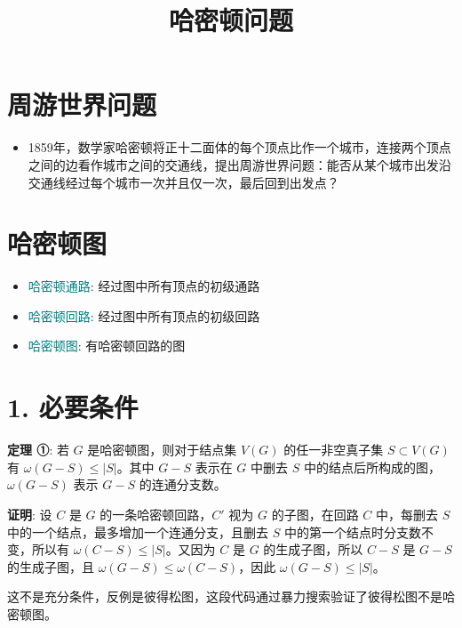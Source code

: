 \documentclass{article}
\begin{document}
\title{哈密顿问题}
\author{}
\date{}
\maketitle

\thispagestyle{empty}
\newpage

\section*{周游世界问题}

\begin{itemize}
  \item 1859年，数学家哈密顿将正十二面体的每个顶点比作一个城市，连接两个顶点之间的边看作城市之间的交通线，提出周游世界问题：能否从某个城市出发沿交通线经过每个城市一次并且仅一次，最后回到出发点？
\end{itemize}



\section*{哈密顿图}

\begin{itemize}
  \item \textcolor{teal}{哈密顿通路}: 经过图中所有顶点的初级通路
  \item \textcolor{teal}{哈密顿回路}: 经过图中所有顶点的初级回路
  \item \textcolor{teal}{哈密顿图}: 有哈密顿回路的图
\end{itemize}



\section*{1. 必要条件}

\textbf{定理 ①}: 若 $G$ 是哈密顿图，则对于结点集 $V(G)$ 的任一非空真子集 $S \subset V(G)$ 有 $\omega(G - S) \leq |S|$。其中 $G - S$ 表示在 $G$ 中删去 $S$ 中的结点后所构成的图，$\omega(G - S)$ 表示 $G - S$ 的连通分支数。

\textbf{证明}: 设 $C$ 是 $G$ 的一条哈密顿回路，$C'$ 视为 $G$ 的子图，在回路 $C$ 中，每删去 $S$ 中的一个结点，最多增加一个连通分支，且删去 $S$ 中的第一个结点时分支数不变，所以有 $\omega(C - S) \leq |S|$。又因为 $C$ 是 $G$ 的生成子图，所以 $C - S$ 是 $G - S$ 的生成子图，且 $\omega(G - S) \leq \omega(C - S)$，因此 $\omega(G - S) \leq |S|$。

这不是充分条件，反例是彼得松图，这段代码通过暴力搜索验证了彼得松图不是哈密顿图。
\end{document}
